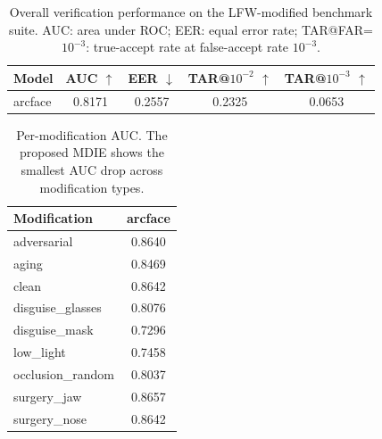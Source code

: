 \begin{table}[t]
\centering
\caption{Overall verification performance on the LFW-modified benchmark suite. AUC: area under ROC; EER: equal error rate; TAR@FAR=$10^{-3}$: true-accept rate at false-accept rate $10^{-3}$.}
\label{tab:overall}
\begin{tabular}{lcccc}
\hline
Model & AUC $\uparrow$ & EER $\downarrow$ & TAR@$10^{-2}$ $\uparrow$ & TAR@$10^{-3}$ $\uparrow$ \\
\hline
arcface & 0.8171 & 0.2557 & 0.2325 & 0.0653 \\
\hline
\end{tabular}
\end{table}

\begin{table}[t]
\centering
\caption{Per-modification AUC. The proposed MDIE shows the smallest AUC drop across modification types.}
\label{tab:permod}
\begin{tabular}{lc}
\hline
Modification & arcface \\
\hline
adversarial & 0.8640 \\
aging & 0.8469 \\
clean & 0.8642 \\
disguise_glasses & 0.8076 \\
disguise_mask & 0.7296 \\
low_light & 0.7458 \\
occlusion_random & 0.8037 \\
surgery_jaw & 0.8657 \\
surgery_nose & 0.8642 \\
\hline
\end{tabular}
\end{table}
